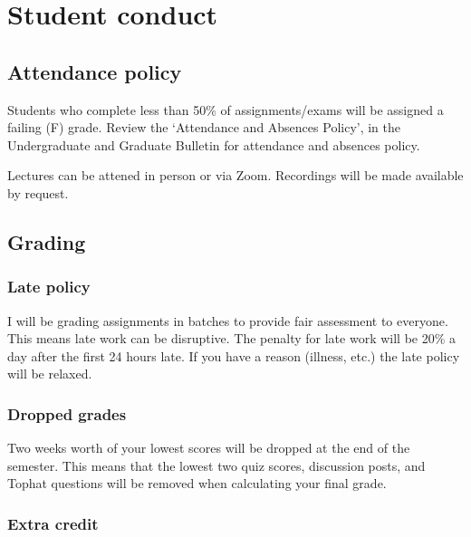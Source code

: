 \documentclass[11pt,]{article}
\begin{document}
\newpage

\hypertarget{student-conduct}{%
\section{Student conduct}\label{student-conduct}}

\hypertarget{attendance-policy}{%
\subsection{Attendance policy}\label{attendance-policy}}

Students who complete less than 50\% of assignments/exams will be
assigned a failing (F) grade. Review the `Attendance and Absences
Policy', in the Undergraduate and Graduate Bulletin for attendance and
absences policy.

Lectures can be attened in person or via Zoom. Recordings will be made
available by request.

\hypertarget{grading}{%
\subsection{Grading}\label{grading}}

\hypertarget{late-policy}{%
\subsubsection{Late policy}\label{late-policy}}

I will be grading assignments in batches to provide fair assessment to
everyone. This means late work can be disruptive. The penalty for late
work will be 20\% a day after the first 24 hours late. If you have a
reason (illness, etc.) the late policy will be relaxed.

\hypertarget{dropped-grades}{%
\subsubsection{Dropped grades}\label{dropped-grades}}

Two weeks worth of your lowest scores will be dropped at the end of the
semester. This means that the lowest two quiz scores, discussion posts,
and Tophat questions will be removed when calculating your final grade.

\hypertarget{extra-credit}{%
\subsubsection{Extra credit}\label{extra-credit}}
\end{document}
